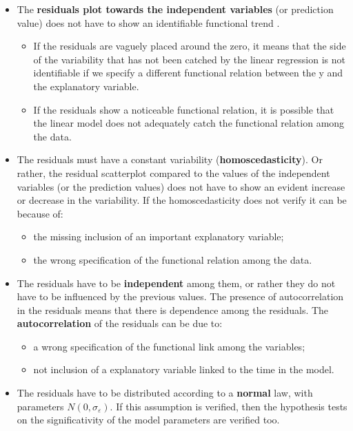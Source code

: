 \begin{frame}
  \vspace*{-.15cm}
  \begin{itemize}
    \item The \textbf{residuals plot towards the independent variables} (or prediction value) does not have to show an identifiable functional trend .
    \begin{itemize}
      \item If the residuals are vaguely placed around the zero, it means that the side of the variability that has not been catched by the linear regression is not identifiable if we specify a different functional relation between the y and the explanatory variable.
      \item If the residuals show a noticeable functional relation, it is possible that the linear model does not adequately catch the functional relation among the data.
    \end{itemize}
    \item The residuals must have a constant variability (\textbf{homoscedasticity}). Or rather, the residual scatterplot compared to the values of the independent variables (or the prediction values) does not have to show an evident increase or decrease in the variability. If the homoscedasticity does not verify it can be because of:
    \begin{itemize}
      \item the missing inclusion of an important explanatory variable;
      \item the wrong specification of the functional relation among the data.
    \end{itemize}
  \end{itemize}
\end{frame}

\begin{frame}
  \vspace{.5cm}
  \begin{itemize}
    \item The residuals have to be \textbf{independent} among them, or rather they do not have to be influenced by the previous values. The presence of autocorrelation in the residuals means that there is dependence among the residuals. The \textbf{autocorrelation} of the residuals can be due to:
    \begin{itemize}
      \item a wrong specification of the functional link among the variables;
      \item not inclusion of a explanatory variable linked to the time in the model.
    \end{itemize}
  \vspace{.5cm}
  \item The residuals have to be distributed according to a \textbf{normal} law, with parameters $ N(0, \sigma_\varepsilon)$. If this assumption is verified, then the hypothesis tests on the significativity of the model parameters are verified too. 
  \end{itemize}
\end{frame}

